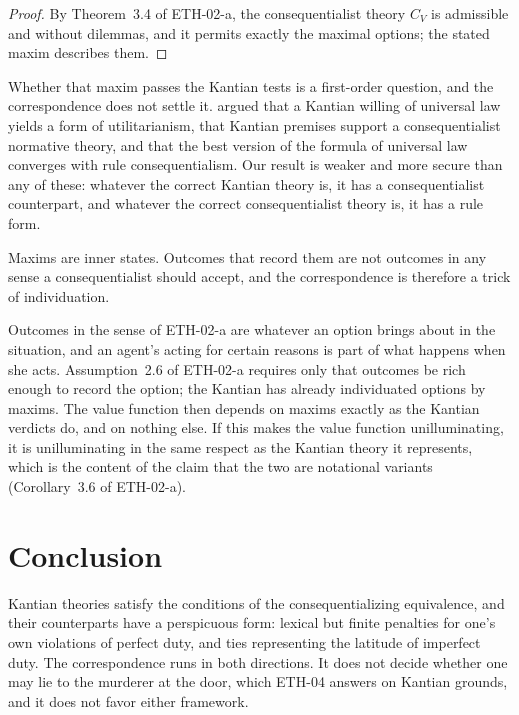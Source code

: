 \documentclass{situationist-preprint}
\begin{document}
\begin{proof}
By Theorem~3.4 of ETH-02-a, the consequentialist theory $C_V$ is admissible and without dilemmas, and it permits exactly the maximal options; the stated maxim describes them.
\end{proof}

Whether that maxim passes the Kantian tests is a first-order question, and the correspondence does not settle it. \citet{Hare1993} argued that a Kantian willing of universal law yields a form of utilitarianism, \citet{Cummiskey1996} that Kantian premises support a consequentialist normative theory, and \citet{Parfit2011} that the best version of the formula of universal law converges with rule consequentialism. Our result is weaker and more secure than any of these: whatever the correct Kantian theory is, it has a consequentialist counterpart, and whatever the correct consequentialist theory is, it has a rule form.

\begin{objection}
Maxims are inner states. Outcomes that record them are not outcomes in any sense a consequentialist should accept, and the correspondence is therefore a trick of individuation.
\end{objection}

\begin{reply}
Outcomes in the sense of ETH-02-a are whatever an option brings about in the situation, and an agent's acting for certain reasons is part of what happens when she acts. Assumption~2.6 of ETH-02-a requires only that outcomes be rich enough to record the option; the Kantian has already individuated options by maxims. The value function then depends on maxims exactly as the Kantian verdicts do, and on nothing else. If this makes the value function unilluminating, it is unilluminating in the same respect as the Kantian theory it represents, which is the content of the claim that the two are notational variants (Corollary~3.6 of ETH-02-a).
\end{reply}

\section{Conclusion}

Kantian theories satisfy the conditions of the consequentializing equivalence, and their counterparts have a perspicuous form: lexical but finite penalties for one's own violations of perfect duty, and ties representing the latitude of imperfect duty. The correspondence runs in both directions. It does not decide whether one may lie to the murderer at the door, which ETH-04 answers on Kantian grounds, and it does not favor either framework.
\end{document}
